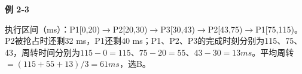 {\color{ink}\bfseries 例 2-3}\par\vspace{1bp}执行区间（ms）：P1[0,\allowbreak{}20)\(\to \)P2[20,\allowbreak{}30)\(\to \)P3[30,\allowbreak{}43)\(\to \)P2[43,\allowbreak{}75)\(\to \)P1[75,\allowbreak{}115)。P2被抢占时还剩32 ms，P1还剩40 ms；P1、P2、P3的完成时刻分别为115、75、43，周转时间分别为\(115-0=\allowbreak{}115\)、\(75-20=\allowbreak{}55\)、\(43-30=\allowbreak{}13 ms\)。平均周转\(=\allowbreak{}(115+\allowbreak{}55+\allowbreak{}13)/\allowbreak{}3=\allowbreak{}61 ms\)，选B。
